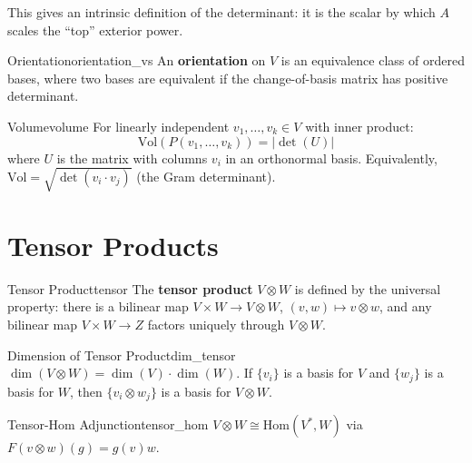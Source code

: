 \documentclass[11pt, letterpaper, openany]{book}
\begin{document}
This gives an intrinsic definition of the determinant: it is the scalar by which $A$ scales the ``top'' exterior power.

\begin{defn}{Orientation}{orientation_vs}
An \textbf{orientation} on $V$ is an equivalence class of ordered bases, where two bases are equivalent if the change-of-basis matrix has positive determinant.
\end{defn}

\begin{defn}{Volume}{volume}
For linearly independent $v_1, \ldots, v_k \in V$ with inner product:
\[
\text{Vol}(P(v_1, \ldots, v_k)) = |\det(U)|
\]
where $U$ is the matrix with columns $v_i$ in an orthonormal basis. Equivalently, $\text{Vol} = \sqrt{\det(v_i \cdot v_j)}$ (the Gram determinant).
\end{defn}

\section{Tensor Products}

\begin{defn}{Tensor Product}{tensor}
The \textbf{tensor product} $V \otimes W$ is defined by the universal property: there is a bilinear map $V \times W \to V \otimes W$, $(v, w) \mapsto v \otimes w$, and any bilinear map $V \times W \to Z$ factors uniquely through $V \otimes W$.
\end{defn}

\begin{thm}{Dimension of Tensor Product}{dim_tensor}
$\dim(V \otimes W) = \dim(V) \cdot \dim(W)$. If $\{v_i\}$ is a basis for $V$ and $\{w_j\}$ is a basis for $W$, then $\{v_i \otimes w_j\}$ is a basis for $V \otimes W$.
\end{thm}

\begin{thm}{Tensor-Hom Adjunction}{tensor_hom}
$V \otimes W \cong \text{Hom}(V^*, W)$ via $F(v \otimes w)(g) = g(v)w$.
\end{thm}
\end{document}
